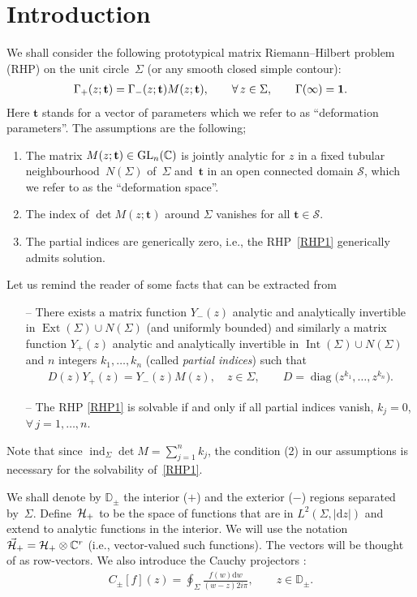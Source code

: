 \documentclass[pdftex]{sigma}
\numberwithin{equation}{section}
\def\D{\mathbb D}
\def \G{\Gamma}
\def\C{{\mathbb C}}
\def\H{{\cal H}}
\def\d{\mathrm d}
\def\1{{\bf 1}}
\def \t{\mathbf t}
\begin{document}
\section{Introduction}
We shall consider the following prototypical matrix Riemann--Hilbert problem (RHP) on the unit circle~$\Sigma$ (or any smooth closed simple contour):
\begin{gather}
\G_+(z;\t) = \G_-(z;\t) M(z;\t),\qquad \forall\, z\in \Sigma, \qquad \G(\infty)=\1.\label{RHP1}
\end{gather}
Here $\t$ stands for a vector of parameters which we refer to as ``deformation parameters''. The assumptions are the following;
\begin{enumerate}\itemsep=0pt
\item The matrix $M(z;\t)\in {\rm GL}_n(\C)$ is jointly analytic for $z$ in a f\/ixed tubular neighbourhood~$N(\Sigma)$ of~$\Sigma$ and~$\t$ in an open connected domain $\mathcal S$, which we refer to as the ``deformation space''.
\item The index of $\det M(z;\t)$ around $\Sigma$ vanishes for all $\t\in \mathcal S$.
\item The partial indices are generically zero, i.e., the RHP~\eqref{RHP1} generically admits solution.
\end{enumerate}
Let us remind the reader of some facts that can be extracted from \cite{ClanceyGohberg}
\begin{enumerate}\itemsep=0pt
\item [--]There exists a matrix function $Y_-(z)$ analytic and analytically invertible in $\operatorname{Ext}(\Sigma) \cup N(\Sigma)$ (and uniformly bounded) and similarly a matrix function $Y_+(z)$ analytic and analytically invertible in $\operatorname{Int}(\Sigma) \cup N(\Sigma)$ and $n$ integers $k_1,\dots, k_n$ (called {\em partial indices}) such that
\begin{gather*}
D(z) Y_+(z) = Y_-(z) M(z), \quad z\in \Sigma , \qquad D = \operatorname{diag}\big( z^{k_1}, \dots, z^{k_n}\big) .
\end{gather*}
\item [--] The RHP \eqref{RHP1} is solvable if and only if all partial indices vanish, $k_j=0$, $\forall\, j=1,\dots, n$.
\end{enumerate}
 Note that since $\operatorname{ind}_\Sigma \det M=\sum\limits_{j=1}^n k_j$, the condition (2) in our assumptions is necessary for the solvability of~\eqref{RHP1}.

We shall denote by $\D_\pm$ the interior ($+$) and the exterior ($-$) regions separated by~$\Sigma$. Def\/i\-ne~$\H_+$ to be the space of functions that are in $L^2(\Sigma, |\d z|)$ and extend to analytic functions in the interior. We will use the notation $\vec \H_+ = \H_+\otimes \C^r$ (i.e., vector-valued such functions). The vectors will be thought of as row-vectors. We also introduce the Cauchy projectors \smash{$C_\pm\colon L^2(\Sigma,|\d z|) \to \H_{\pm}$}:
\begin{gather*}
C_\pm[f](z) = \oint_{\Sigma } \frac { f(w)\d w}{(w-z)2i\pi},\qquad z \in \D_\pm.
\end{gather*}
\end{document}
